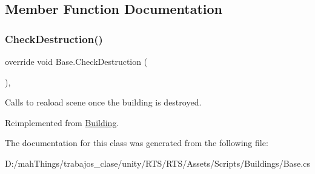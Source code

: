 \subsection{Member Function Documentation}
\mbox{\label{class_base_a4e6f54bb492b4bf669ebb274cc978d35}} 
\subsubsection{\texorpdfstring{Check\+Destruction()}{CheckDestruction()}}
{\footnotesize\ttfamily override void Base.\+Check\+Destruction (\begin{DoxyParamCaption}{ }\end{DoxyParamCaption})\hspace{0.3cm}{\ttfamily [protected]}, {\ttfamily [virtual]}}



Calls to reaload scene once the building is destroyed. 



Reimplemented from \mbox{\hyperlink{class_building}{Building}}.



The documentation for this class was generated from the following file\+:\begin{DoxyCompactItemize}
\item 
D\+:/mah\+Things/trabajos\+\_\+clase/unity/\+R\+T\+S/\+R\+T\+S/\+Assets/\+Scripts/\+Buildings/Base.\+cs\end{DoxyCompactItemize}
